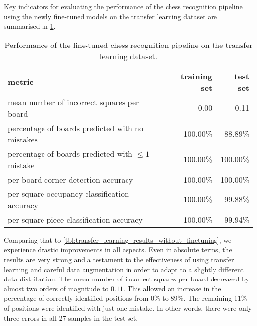 \documentclass[../main.tex]{subfiles}
\begin{document}
Key indicators for evaluating the performance of the chess recognition pipeline using the newly fine-tuned models on the transfer learning dataset are summarised in \cref{tbl:transfer_learning_results}.
\begin{table}
    \centering
    \begin{tabular}{lrr}
        \toprule
        metric & training set & test set \\
        \midrule
        mean number of incorrect squares per board           & 0.00     & 0.11 \\
        percentage of boards predicted with no mistakes      & 100.00\% & 88.89\%   \\
        percentage of boards predicted with $\leq 1$ mistake & 100.00\% & 100.00\%   \\
        per-board corner detection accuracy                  & 100.00\% & 100.00\% \\
        per-square occupancy classification accuracy         & 100.00\% & 99.88\% \\
        per-square piece classification accuracy             & 100.00\% & 99.94\% \\
        \bottomrule
    \end{tabular}
    \caption{Performance of the fine-tuned chess recognition pipeline on the transfer learning dataset.}
    \label{tbl:transfer_learning_results}
\end{table}
Comparing that to \cref{tbl:transfer_learning_results_without_finetuning}, we experience drastic improvements in all aspects.
Even in absolute terms, the results are very strong and a testament to the effectiveness of using transfer learning and careful data augmentation in order to adapt to a slightly different data distribution.
The mean number of incorrect squares per board decreased by almost two orders of magnitude to $0.11$.
This allowed an increase in the percentage of correctly identified positions from 0\% to 89\%. 
The remaining 11\% of positions were identified with just one mistake.
In other words, there were only three errors in all 27 samples in the test set.
\end{document}
